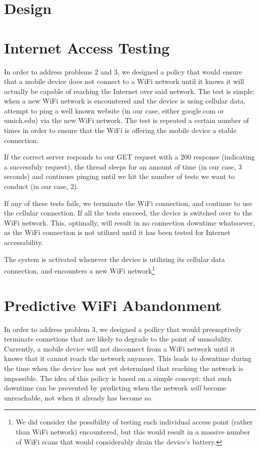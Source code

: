 \section{Design}
\label{sec:design}


\section{Internet Access Testing} %
In order to address problems 2 and 3, we designed a policy that would ensure that a mobile device does not connect to a WiFi network until it knows it will actually be capable of reaching the Internet over said network. The test is simple: when a new WiFi network is encountered and the device is using cellular data, attempt to ping a well known website (in our case, either google.com or umich.edu) via the new WiFi network. The test is repeated a certain number of times in order to ensure that the WiFi is offering the mobile device a stable connection.

If the correct server responds to our GET request with a 200 response (indicating a successfuly request), the thread sleeps for an amount of time (in our case, 3 seconds) and continues pinging until we hit the number of tests we want to conduct (in our case, 2).

If any of these tests fails, we terminate the WiFi connection, and continue to use the cellular connection. If all the tests succeed, the device is switched over to the WiFi network. This, optimally, will result in no connection downtime whatsoever, as the WiFi connection is not utilized until it has been tested for Internet accessability.

The system is activated whenever the device is utilizing its cellular data connection, and encounters a new WiFi network\footnote{We did consider the possibility of testing each individual access point (rather than WiFi network) encountered, but this would result in a massive number of WiFi scans that would considerably drain the device's battery.}

\section{Predictive WiFi Abandonment}
In order to address problem 3, we designed a poilicy that would preemptively terminate connetions that are likely to degrade to the point of unusability. Currently, a mobile device will not disconnect from a WiFi network until it knows that it cannot reach the network anymore. This leads to downtime during the time when the device has not yet determined that reaching the network is impossible. The idea of this policy is based on a simple concept: that such downtime can be prevented by predicting when the network \emph{will} become unreachable, not when it already has become so.

